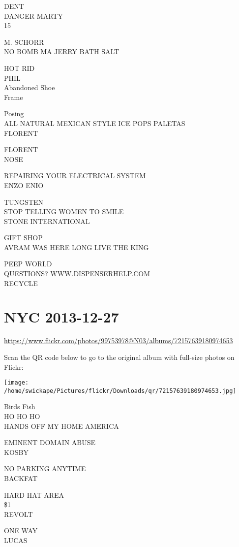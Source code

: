 \documentclass[10pt,letterpaper]{article}
\begin{document}
DENT\\
DANGER MARTY\\
15

M. SCHORR\\
NO BOMB MA JERRY BATH SALT

HOT RID\\
PHIL\\
Abandoned Shoe\\
Frame

Posing\\
ALL NATURAL MEXICAN STYLE ICE POPS PALETAS\\
FLORENT

FLORENT\\
NOSE

REPAIRING YOUR ELECTRICAL SYSTEM\\
ENZO ENIO

TUNGSTEN\\
STOP TELLING WOMEN TO SMILE\\
STONE INTERNATIONAL

GIFT SHOP\\
AVRAM WAS HERE LONG LIVE THE KING

PEEP WORLD\\
QUESTIONS?  WWW.DISPENSERHELP.COM\\
RECYCLE
\pagebreak

\section*{NYC 2013-12-27}

\url{https://www.flickr.com/photos/99753978@N03/albums/72157639180974653}

Scan the QR code below to go to the original album with full-size photos on Flickr:

\texttt{[image: /home/swickape/Pictures/flickr/Downloads/qr/72157639180974653.jpg]}
\pagebreak

Birds Fish\\
HO HO HO\\
HANDS OFF MY HOME AMERICA

EMINENT DOMAIN ABUSE\\
KOSBY

NO PARKING ANYTIME\\
BACKFAT

HARD HAT AREA\\
\$1\\
REVOLT

ONE WAY\\
LUCAS
\pagebreak
\end{document}
